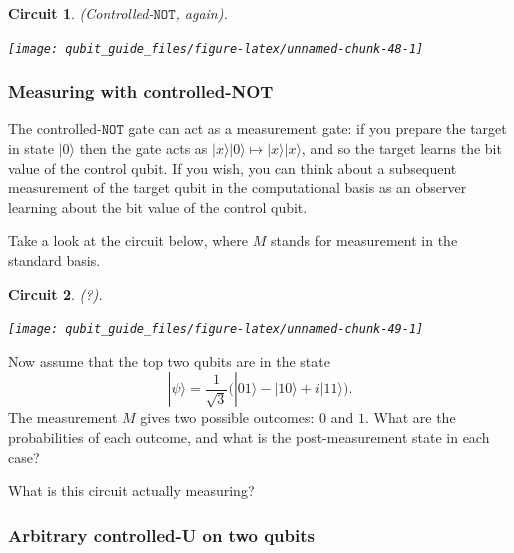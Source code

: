 \documentclass[fleqn,a4paper]{article}
\newtheorem*{circuit}{Circuit}
\theoremstyle{definition}
\theoremstyle{definition}
\theoremstyle{definition}
\theoremstyle{definition}
\theoremstyle{remark}
\begin{document}
\begin{circuit}

\emph{(Controlled-\(\texttt{NOT}\), again).}

\begin{center}\texttt{[image: qubit\_guide\_files/figure-latex/unnamed-chunk-48-1]} \end{center}

\end{circuit}

\hypertarget{measuring-with-controlled-not}{%
\subsubsection{Measuring with controlled-NOT}\label{measuring-with-controlled-not}}

The controlled-\(\texttt{NOT}\) gate can act as a measurement gate: if you prepare the target in state \(|0\rangle\) then the gate acts as \(|x\rangle|0\rangle\mapsto|x\rangle|x\rangle\), and so the target learns the bit value of the control qubit.
If you wish, you can think about a subsequent measurement of the target qubit in the computational basis as an observer learning about the bit value of the control qubit.

Take a look at the circuit below, where \(M\) stands for measurement in the standard basis.

\begin{circuit}

\emph{(?).}

\begin{center}\texttt{[image: qubit\_guide\_files/figure-latex/unnamed-chunk-49-1]} \end{center}

\end{circuit}

Now assume that the top two qubits are in the state
\[
  |\psi\rangle
  = \frac{1}{\sqrt3}\big( |01\rangle - |10\rangle + i|11\rangle \big).
\]
The measurement \(M\) gives two possible outcomes: \(0\) and \(1\).
What are the probabilities of each outcome, and what is the post-measurement state in each case?

What is this circuit actually measuring?

\hypertarget{arbitrary-controlled-u-on-two-qubits}{%
\subsubsection{Arbitrary controlled-U on two qubits}\label{arbitrary-controlled-u-on-two-qubits}}
\end{document}
